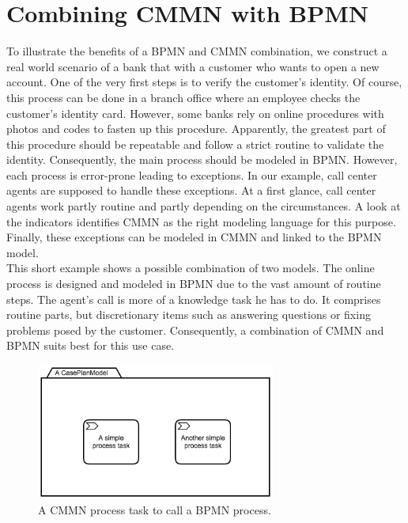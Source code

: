 \section{Combining CMMN with BPMN}
To illustrate the benefits of a BPMN and CMMN combination, we construct a real world scenario of a bank that with a customer who wants to open a new account. One of the very first steps is to verify the customer's identity. Of course, this process can be done in a branch office where an employee checks the customer's identity card. However, some banks rely on online procedures with photos and codes to fasten up this procedure. Apparently, the greatest part of this procedure should be repeatable and follow a strict routine to validate the identity. Consequently, the main process should be modeled in BPMN. However, each process is error-prone leading to exceptions. In our example, call center agents are supposed to handle these exceptions. At a first glance, call center agents work partly routine and partly depending on the circumstances. A look at the indicators identifies CMMN as the right modeling language for this purpose. Finally, these exceptions can be modeled in CMMN and linked to the BPMN model. 
 \\
This short example shows a possible combination of two models. The online process is designed and modeled in BPMN due to the vast amount of routine steps. The agent's call is more of a knowledge task he has to do. It comprises routine parts, but discretionary items such as answering questions or fixing problems posed by the customer. Consequently, a combination of CMMN and BPMN suits best for this use case. 

\begin{figure}
  \centering
    \includegraphics[width=0.7\textwidth]{../figures/chapter_combinations/CMMN_Process_Tasks.png}
      \caption{A CMMN process task to call a BPMN process.}
      \label{fig:CMMN_process_task}
\end{figure}

